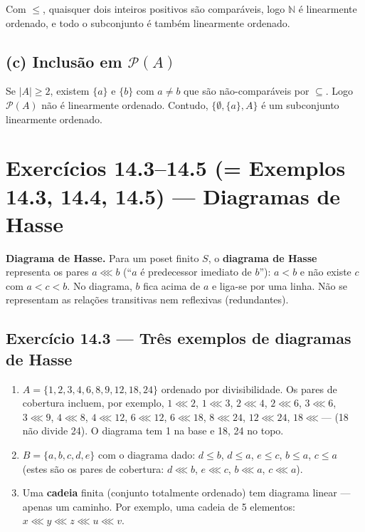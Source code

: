 \documentclass[12pt,a4paper]{article}
\newcommand{\keyword}[1]{\textbf{\textcolor{azul}{#1}}}
\begin{document}
Com $\le$, quaisquer dois inteiros positivos são comparáveis, logo $\mathbb{N}$ é
linearmente ordenado, e todo o subconjunto é também linearmente ordenado.

\subsection*{(c) Inclusão em $\mathcal{P}(A)$}

Se $|A| \ge 2$, existem $\{a\}$ e $\{b\}$ com $a \ne b$ que são não-comparáveis por $\subseteq$.
Logo $\mathcal{P}(A)$ não é linearmente ordenado.
Contudo, $\{\emptyset, \{a\}, A\}$ é um subconjunto linearmente ordenado.

\section*{Exercícios 14.3--14.5 (= Exemplos 14.3, 14.4, 14.5) — Diagramas de Hasse}

\begin{teoriacaixa}
\textbf{Diagrama de Hasse.} Para um poset finito $S$, o \keyword{diagrama de Hasse}
representa os pares $a \lll b$ (``$a$ é predecessor imediato de $b$''): $a < b$ e
não existe $c$ com $a < c < b$. No diagrama, $b$ fica acima de $a$ e liga-se por
uma linha. Não se representam as relações transitivas nem reflexivas (redundantes).
\end{teoriacaixa}

\subsection*{Exercício 14.3 — Três exemplos de diagramas de Hasse}

\begin{enumerate}[label=(\alph*)]
  \item $A = \{1,2,3,4,6,8,9,12,18,24\}$ ordenado por divisibilidade.
        Os pares de cobertura incluem, por exemplo, $1 \lll 2$, $1 \lll 3$,
        $2 \lll 4$, $2 \lll 6$, $3 \lll 6$, $3 \lll 9$, $4 \lll 8$, $4 \lll 12$,
        $6 \lll 12$, $6 \lll 18$, $8 \lll 24$, $12 \lll 24$, $18 \lll \text{---}$
        (18 não divide 24). O diagrama tem 1 na base e 18, 24 no topo.

  \item $B = \{a,b,c,d,e\}$ com o diagrama dado: $d \le b$, $d \le a$, $e \le c$,
        $b \le a$, $c \le a$ (estes são os pares de cobertura: $d \lll b$, $e \lll c$,
        $b \lll a$, $c \lll a$).

  \item Uma \keyword{cadeia} finita (conjunto totalmente ordenado) tem diagrama linear
        — apenas um caminho. Por exemplo, uma cadeia de 5 elementos:
        $x \lll y \lll z \lll u \lll v$.
\end{enumerate}
\end{document}
